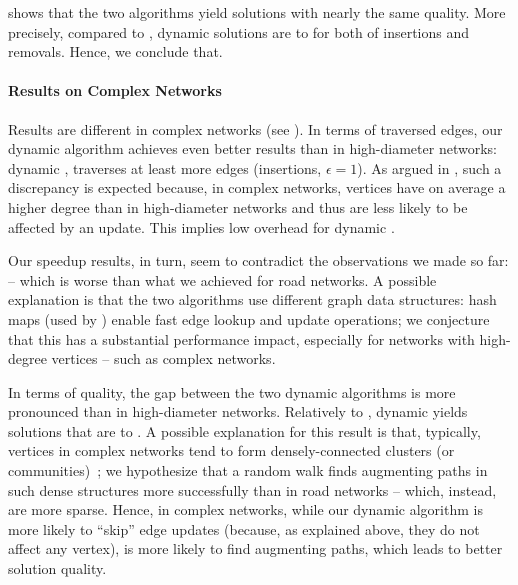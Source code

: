  shows that the two algorithms yield solutions
with nearly the same quality. More precisely, compared to \dynmwmrandom,
dynamic \suitor solutions are \qualRWInsRoadLowEps to \qualRWInsRoadHighEps for
both of insertions and removals. Hence, we conclude that.


\paragraph{Results on Complex Networks}
%
Results are different in complex networks
(see ).
In terms of traversed edges, our dynamic algorithm achieves even better results
than in high-diameter networks: \wrt dynamic \suitor, \dynmwmrandom traverses
at least \vedgesRWInsCplxHighEps more edges (insertions, $\epsilon = 1$).
As argued in , such a discrepancy
is expected because, in complex networks,
vertices have on average a higher
degree than in high-diameter networks and thus are less likely to be affected
by an update. This implies low overhead for dynamic \suitor.

Our speedup results, in turn, seem to contradict the observations we made so
far:  --
which is worse than what we achieved for road networks. A possible explanation
is that the two algorithms use different graph data structures:
hash maps (used by \dynmwmrandom) enable fast edge lookup and update
operations; we conjecture that this has a
substantial performance impact, especially for networks with high-degree
vertices -- such as complex networks.

In terms of  quality, the gap between the two dynamic algorithms is more
pronounced than in high-diameter networks. Relatively to \dynmwmrandom, dynamic
\suitor yields solutions that are \quaRWLowest to \qualRWInsCplxHighEps.
A possible explanation for this result is that, typically, vertices in complex
networks tend to form densely-connected clusters
(or communities)~\cite[Ch. 10]{newman2018networks}; we hypothesize that a random walk
finds augmenting paths in such dense structures more successfully than in road
networks -- which, instead, are more sparse.
Hence, in complex networks, while our dynamic algorithm is more
likely to \enquote{skip} edge
updates (because, as explained above, they do not affect any vertex),
\dynmwmrandom is more likely to find augmenting paths, which leads to better
solution quality.

